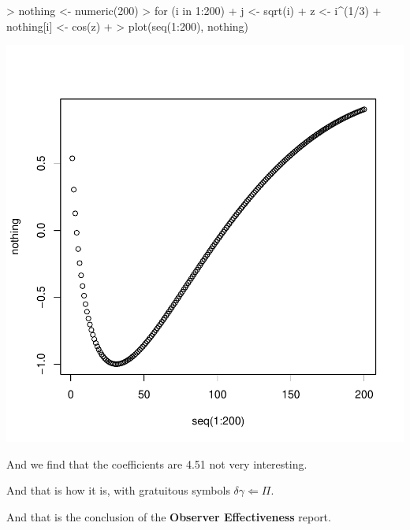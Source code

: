 \documentclass[a4paper]{article}
\begin{document}
\begin{Schunk}
\begin{Sinput}
> nothing <- numeric(200)
> for (i in 1:200) {
+     j <- sqrt(i)
+     z <- i^(1/3)
+     nothing[i] <- cos(z)
+ }
> plot(seq(1:200), nothing)
\end{Sinput}
\end{Schunk}
\includegraphics{first-sweave-b}

And we find that the coefficients are 4.51 
not very interesting.

And that is how it is, with gratuitous symbols $\delta \gamma \Leftarrow \Pi$.

And that is the conclusion of the \textbf{Observer Effectiveness} report.
\end{document}

